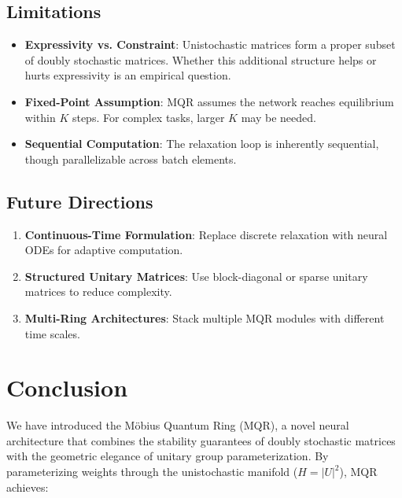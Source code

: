 \documentclass[11pt,a4paper]{article}
\begin{document}
\subsection{Limitations}

\begin{itemize}
    \item \textbf{Expressivity vs. Constraint}: Unistochastic matrices form a proper subset of doubly stochastic matrices. Whether this additional structure helps or hurts expressivity is an empirical question.
    
    \item \textbf{Fixed-Point Assumption}: MQR assumes the network reaches equilibrium within $K$ steps. For complex tasks, larger $K$ may be needed.
    
    \item \textbf{Sequential Computation}: The relaxation loop is inherently sequential, though parallelizable across batch elements.
\end{itemize}

\subsection{Future Directions}

\begin{enumerate}
    \item \textbf{Continuous-Time Formulation}: Replace discrete relaxation with neural ODEs for adaptive computation.
    
    \item \textbf{Structured Unitary Matrices}: Use block-diagonal or sparse unitary matrices to reduce complexity.
    
    \item \textbf{Multi-Ring Architectures}: Stack multiple MQR modules with different time scales.
\end{enumerate}

\section{Conclusion}
\label{sec:conclusion}

We have introduced the Möbius Quantum Ring (MQR), a novel neural architecture that combines the stability guarantees of doubly stochastic matrices with the geometric elegance of unitary group parameterization. By parameterizing weights through the unistochastic manifold ($H = |U|^2$), MQR achieves:
\end{document}
